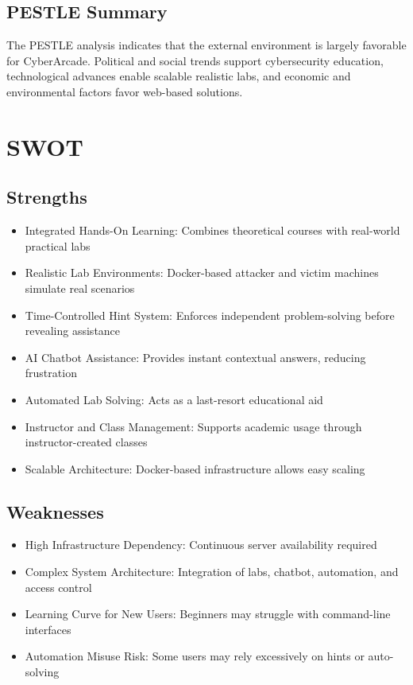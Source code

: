 \documentclass[12pt,a4paper]{report}
\begin{document}
\subsection{PESTLE Summary}

The PESTLE analysis indicates that the external environment is largely favorable for CyberArcade.
Political and social trends support cybersecurity education, technological advances enable scalable
realistic labs, and economic and environmental factors favor web-based solutions.

\section{SWOT}

\subsection{Strengths}
\begin{itemize}
  \item Integrated Hands-On Learning: Combines theoretical courses with real-world practical labs
  \item Realistic Lab Environments: Docker-based attacker and victim machines simulate real scenarios
  \item Time-Controlled Hint System: Enforces independent problem-solving before revealing assistance
  \item AI Chatbot Assistance: Provides instant contextual answers, reducing frustration
  \item Automated Lab Solving: Acts as a last-resort educational aid
  \item Instructor and Class Management: Supports academic usage through instructor-created classes
  \item Scalable Architecture: Docker-based infrastructure allows easy scaling
\end{itemize}

\subsection{Weaknesses}
\begin{itemize}
  \item High Infrastructure Dependency: Continuous server availability required
  \item Complex System Architecture: Integration of labs, chatbot, automation, and access control
  \item Learning Curve for New Users: Beginners may struggle with command-line interfaces
  \item Automation Misuse Risk: Some users may rely excessively on hints or auto-solving
\end{itemize}
\end{document}
